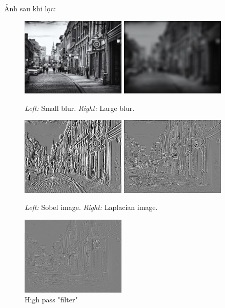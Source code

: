 Ảnh sau khi lọc:
\begin{figure}[H]
    \centering
    \includegraphics[width=5cm]{images/results_part1/image1/blur_image.jpg}
    \includegraphics[width=5cm]{images/results_part1/image1/large_blur_image.jpg}
    \caption{\emph{Left:} Small blur. \emph{Right:} Large blur.}
\end{figure}

\begin{figure}[H]
    \centering
    \includegraphics[width=5cm]{images/results_part1/image1/sobel_image.jpg}
    \includegraphics[width=5cm]{images/results_part1/image1/laplacian_image.jpg}
    \caption{\emph{Left:} Sobel image. \emph{Right:} Laplacian image.}
\end{figure}

\begin{figure}[H]
    \centering
    \includegraphics[width=5cm]{images/results_part1/image1/high_pass_image.jpg}
    \caption{High pass "filter"}
\end{figure}

